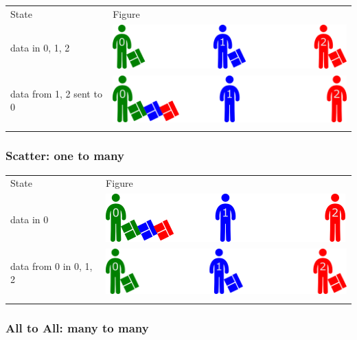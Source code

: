 \begin{longtable}[c]{@{}ll@{}}
\toprule\addlinespace
State & Figure
\\\addlinespace
\midrule\endhead
data in 0, 1, 2 & \includegraphics{06MPI/figures/collective.png}
\\\addlinespace
data from 1, 2 sent to 0 & \includegraphics{06MPI/figures/gather1.png}
\\\addlinespace
\bottomrule
\end{longtable}

\subsubsection{Scatter: one to many}\label{scatter-one-to-many}

\begin{longtable}[c]{@{}ll@{}}
\toprule\addlinespace
State & Figure
\\\addlinespace
\midrule\endhead
data in 0 & \includegraphics{06MPI/figures/gather1.png}
\\\addlinespace
data from 0 in 0, 1, 2 & \includegraphics{06MPI/figures/collective.png}
\\\addlinespace
\bottomrule
\end{longtable}

\subsubsection{All to All: many to many}\label{all-to-all-many-to-many}

